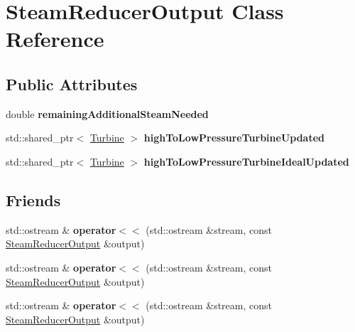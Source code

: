 \hypertarget{class_steam_reducer_output}{}\section{Steam\+Reducer\+Output Class Reference}
\label{class_steam_reducer_output}
\subsection*{Public Attributes}
\begin{DoxyCompactItemize}
\item 
\mbox{\label{class_steam_reducer_output_a80ae45b01500d995e49c7444886ace04}} 
double {\bfseries remaining\+Additional\+Steam\+Needed}
\item 
\mbox{\label{class_steam_reducer_output_a16e68585f1e0c4acfe364fb1cdda063b}} 
std\+::shared\+\_\+ptr$<$ \hyperlink{class_turbine}{Turbine} $>$ {\bfseries high\+To\+Low\+Pressure\+Turbine\+Updated}
\item 
\mbox{\label{class_steam_reducer_output_a8f712a5931ccb670da1aca7227a7eceb}} 
std\+::shared\+\_\+ptr$<$ \hyperlink{class_turbine}{Turbine} $>$ {\bfseries high\+To\+Low\+Pressure\+Turbine\+Ideal\+Updated}
\end{DoxyCompactItemize}
\subsection*{Friends}
\begin{DoxyCompactItemize}
\item 
\mbox{\label{class_steam_reducer_output_a6b2038e96ba90dbe2313925de6b653e0}} 
std\+::ostream \& {\bfseries operator$<$$<$} (std\+::ostream \&stream, const \hyperlink{class_steam_reducer_output}{Steam\+Reducer\+Output} \&output)
\item 
\mbox{\label{class_steam_reducer_output_a6b2038e96ba90dbe2313925de6b653e0}} 
std\+::ostream \& {\bfseries operator$<$$<$} (std\+::ostream \&stream, const \hyperlink{class_steam_reducer_output}{Steam\+Reducer\+Output} \&output)
\item 
\mbox{\label{class_steam_reducer_output_a6b2038e96ba90dbe2313925de6b653e0}} 
std\+::ostream \& {\bfseries operator$<$$<$} (std\+::ostream \&stream, const \hyperlink{class_steam_reducer_output}{Steam\+Reducer\+Output} \&output)
\end{DoxyCompactItemize}


